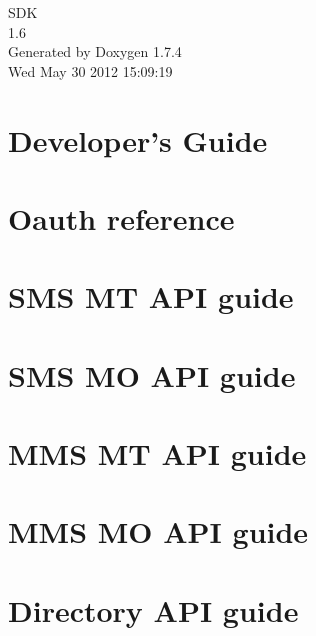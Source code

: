 \documentclass[a4paper]{book}
\begin{document}
\hypersetup{pageanchor=false}
\begin{titlepage}
\vspace*{7cm}
\begin{center}
{\Large SDK \\[1ex]\large 1.6 }\\
\vspace*{1cm}
{\large Generated by Doxygen 1.7.4}\\
\vspace*{0.5cm}
{\small Wed May 30 2012 15:09:19}\\
\end{center}
\end{titlepage}
\clearemptydoublepage
{}
\tableofcontents
\clearemptydoublepage
{}
\hypersetup{pageanchor=true}
\chapter{Developer's Guide}
\label{index}\hypertarget{index}{}
\chapter{Oauth reference}
\label{blv_oauth_guide}
\hypertarget{blv_oauth_guide}{}

\chapter{SMS MT API guide}
\label{blv_sms_mt_guide}
\hypertarget{blv_sms_mt_guide}{}

\chapter{SMS MO API guide}
\label{blv_sms_mo_guide}
\hypertarget{blv_sms_mo_guide}{}

\chapter{MMS MT API guide}
\label{blv_mms_mt_guide}
\hypertarget{blv_mms_mt_guide}{}

\chapter{MMS MO API guide}
\label{blv_mms_mo_guide}
\hypertarget{blv_mms_mo_guide}{}

\chapter{Directory API guide}
\label{blv_directory_guide}
\hypertarget{blv_directory_guide}{}

\end{document}
